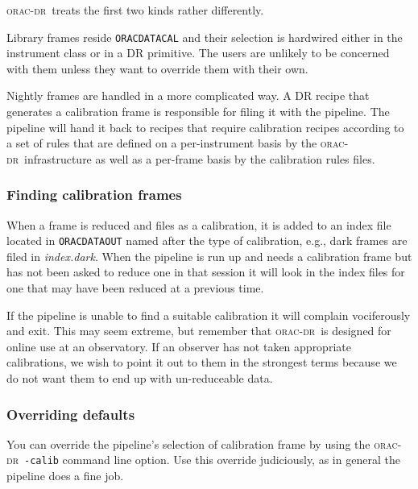 \documentclass[twoside,11pt]{article}
\renewcommand{\_}{\texttt{\symbol{95}}}
\newcommand{\oracdr}{\textsc{orac-dr}}
\begin{document}
\oracdr\ treats the first two kinds rather differently.



Library frames reside \texttt{ORAC\_DATA\_CAL} and their selection is hardwired
either in the instrument class or in a DR primitive. The users are
unlikely to be concerned with them unless they want to override them
with their own.



Nightly frames are handled in a more complicated way. A DR recipe that
generates a calibration frame is responsible for filing it with the
pipeline. The pipeline will hand it back to recipes that require
calibration recipes according to a set of rules that are defined
on a per-instrument basis by the \oracdr\ infrastructure as well
as a per-frame basis by the calibration rules files.

\subsubsection*{Finding calibration frames\label{The_ORAC-DR_Calibration_Selection_Finding_calibration_frames}}

When a frame is reduced and files as a calibration, it is added to an
index file located in \texttt{ORAC\_DATA\_OUT} named after the type of
calibration, e.g., dark frames are filed in \emph{index.dark}. When the
pipeline is run up and needs a calibration frame but has not been
asked to reduce one in that session it will look in the index files
for one that may have been reduced at a previous time.



If the pipeline is unable to find a suitable calibration it will
complain vociferously and exit. This may seem extreme, but remember
that \oracdr\ is designed for online use at an observatory. If an
observer has not taken appropriate calibrations, we wish to point
it out to them in the strongest terms because we do not want them
to end up with un-reduceable data.

\subsubsection*{Overriding defaults\label{The_ORAC-DR_Calibration_Selection_Overriding_defaults}}

You can override the pipeline's selection of calibration frame by
using the \oracdr\ \texttt{-calib} command line option. Use this override
judiciously, as in general the pipeline does a fine job.
\end{document}
